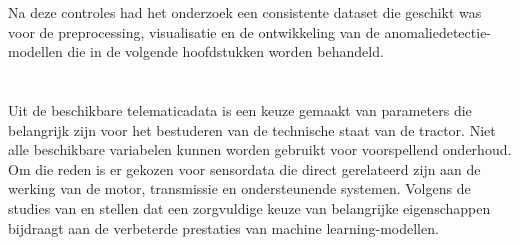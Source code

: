 

Na deze controles had het onderzoek een consistente dataset die geschikt was voor de preprocessing, visualisatie en de ontwikkeling van de anomaliedetectie-modellen die in de volgende hoofdstukken worden behandeld.


\section{}%
\label{sec: geselecteerde parameters uit de verkregen data}

Uit de beschikbare telematicadata is een keuze gemaakt van parameters die belangrijk zijn voor het bestuderen van de technische staat van de tractor. Niet alle beschikbare variabelen kunnen worden gebruikt voor voorspellend onderhoud. Om die reden is er gekozen voor sensordata die direct gerelateerd zijn aan de werking van de motor, transmissie en ondersteunende systemen. Volgens de studies van \textcite{Carvalho2019} en \textcite{Mahale2025} stellen dat een zorgvuldige keuze van belangrijke eigenschappen bijdraagt aan de verbeterde prestaties van machine learning-modellen.

